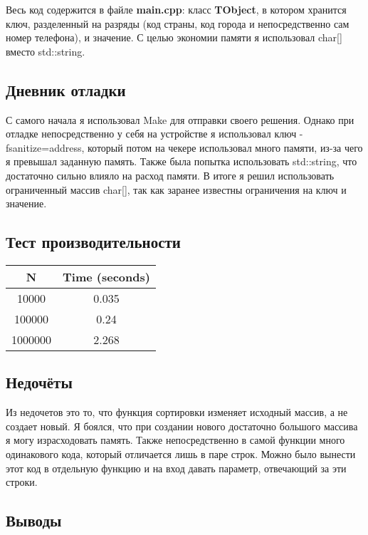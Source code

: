 \documentclass[12pt]{article}
\begin{document}
	Весь код содержится в файле \textbf{main.cpp}: класс \textbf{TObject}, в котором хранится ключ, разделенный на разряды (код страны, код города и непосредственно сам номер телефона), и значение. С целью экономии памяти я использовал char[] вместо std::string.
	
	\subsection*{Дневник отладки}
	
	С самого начала я использовал Make для отправки своего решения. Однако при отладке непосредственно у себя на устройстве я использовал ключ -fsanitize=address, который потом на чекере использовал много памяти, из-за чего я превышал заданную память. Также была попытка использовать std::string, что достаточно сильно влияло на расход памяти. В итоге я решил использовать ограниченный массив char[], так как заранее известны ограничения на ключ и значение.
	
	\subsection*{Тест производительности}
	
\begin{center}
	\begin{tabular}{|c|c|} 
		\hline
		N & Time (seconds)  \\ [0.5ex] 
		\hline\hline
		10000 & 0.035 \\ 
		\hline
		100000 & 0.24  \\
		\hline
		1000000 & 2.268 \\
		\hline
	\end{tabular}
\end{center}

	
	
	\subsection*{Недочёты}
	
	Из недочетов это то, что функция сортировки изменяет исходный массив, а не создает новый. Я боялся, что при создании нового достаточно большого массива я могу израсходовать память. Также непосредственно в самой функции много одинакового кода, который отличается лишь в паре строк. Можно было вынести этот код в отдельную функцию и на вход давать параметр, отвечающий за эти строки. 
	
	\subsection*{Выводы}
	
\end{document}
